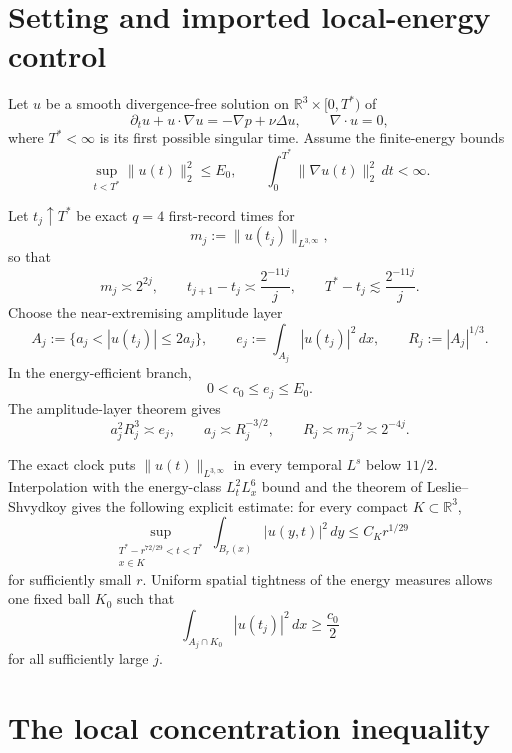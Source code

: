 \documentclass[11pt]{article}
\theoremstyle{remark}
\newcommand{\R}{\mathbb R}
\begin{document}
\section{Setting and imported local-energy control}

Let \(u\) be a smooth divergence-free solution on
\(\R^3\times[0,T^*)\) of
\[
 \partial_tu+u\cdot\nabla u=-\nabla p+\nu\Delta u,
 \qquad
 \nabla\cdot u=0,
\]
where \(T^*<\infty\) is its first possible singular time.  Assume the
finite-energy bounds
\[
 \sup_{t<T^*}\|u(t)\|_2^2\le E_0,
 \qquad
 \int_0^{T^*}\|\nabla u(t)\|_2^2\,dt<\infty.
\]

Let \(t_j\uparrow T^*\) be exact \(q=4\) first-record times for
\[
 m_j:=\|u(t_j)\|_{L^{3,\infty}},
\]
so that
\begin{equation}
 \label{eq:q4-clock}
 m_j\asymp2^{2j},
 \qquad
 t_{j+1}-t_j\asymp\frac{2^{-11j}}j,
 \qquad
 T^*-t_j\lesssim\frac{2^{-11j}}j.
\end{equation}
Choose the near-extremising amplitude layer
\[
 A_j:=\{a_j<|u(t_j)|\le2a_j\},
 \qquad
 e_j:=\int_{A_j}|u(t_j)|^2\,dx,
 \qquad
 R_j:=|A_j|^{1/3}.
\]
In the energy-efficient branch,
\begin{equation}
 \label{eq:energy-efficient}
 0<c_0\le e_j\le E_0.
\end{equation}
The amplitude-layer theorem gives
\begin{equation}
 \label{eq:layer-scaling}
 a_j^2R_j^3\asymp e_j,
 \qquad
 a_j\asymp R_j^{-3/2},
 \qquad
 R_j\asymp m_j^{-2}\asymp2^{-4j}.
\end{equation}

The exact clock puts
\(\|u(t)\|_{L^{3,\infty}}\) in every temporal \(L^s\) below \(11/2\).
Interpolation with the energy-class \(L^2_tL^6_x\) bound and
the theorem of Leslie--Shvydkoy gives the following explicit estimate:
for every compact \(K\subset\R^3\),
\begin{equation}
 \label{eq:explicit-morrey}
 \sup_{\substack{T^*-r^{72/29}<t<T^*\\x\in K}}
 \int_{B_r(x)}|u(y,t)|^2\,dy
 \le C_Kr^{1/29}
\end{equation}
for sufficiently small \(r\).  Uniform spatial tightness of the energy
measures allows one fixed ball \(K_0\) such that
\begin{equation}
 \label{eq:compact-energy}
 \int_{A_j\cap K_0}|u(t_j)|^2\,dx\ge\frac{c_0}{2}
\end{equation}
for all sufficiently large \(j\).

\section{The local concentration inequality}
\end{document}
